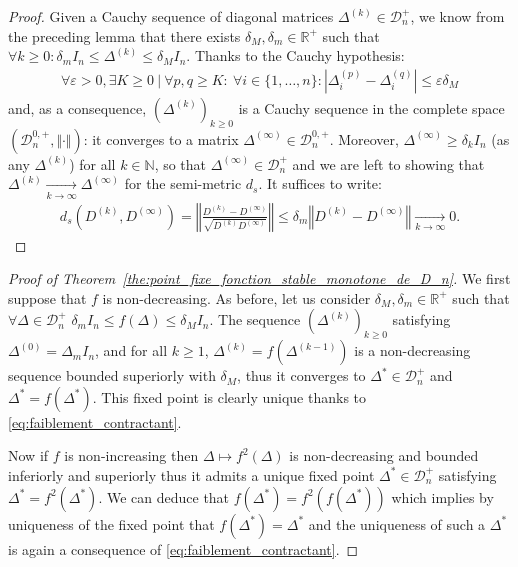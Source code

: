 \documentclass[a4papaer, titlepage]{book}
\begin{document}
\begin{proof}%
  Given a Cauchy sequence of diagonal matrices $\Delta^{(k)} \in \mathcal D_n^+$, we know from the preceding lemma that there exists $\delta_M,\delta_m\in \mathbb R^+ $ such that $\forall k\geq 0:\delta_m I_n \leq \Delta^{(k)} \leq \delta_M I_n$.
  Thanks to the Cauchy hypothesis:
  \begin{align*}
    \forall \varepsilon >0, \exists K \geq 0 \ | \ \forall p,q \geq K: \ \forall i \in \{1,\ldots,n\}: \left\vert \Delta_i^{(p)} - \Delta_i^{(q)}\right\vert \leq \varepsilon \delta_M
  \end{align*}
  and, as a consequence, $(\Delta^{(k)})_{k\geq 0}$ is a Cauchy sequence in the complete space $(\mathcal D_n^{0,+}, \Vert \cdot \Vert)$: it converges to a matrix $\Delta^{(\infty)} \in \mathcal D_n^{0,+}$. Moreover, $\Delta^{(\infty)}\geq \delta_k I_n$ (as any $\Delta^{(k)}$) for all $k\in \mathbb N$, so that $\Delta^{(\infty)} \in \mathcal D_n^+$ and we are left to showing that $\Delta^{(k)}\underset{k \to\infty}{\longrightarrow}\Delta^{(\infty)}$ for the semi-metric $d_s$. It suffices to write:
  \begin{align*}
    d_s(D^{(k)},D^{(\infty)}) = \left\Vert \frac{D^{(k)}-D^{(\infty)}}{\sqrt {D^{(k)}D^{(\infty)}}}\right\Vert \leq \delta_m\left\Vert D^{(k)}-D^{(\infty)}\right\Vert \underset{k \to\infty}{\longrightarrow} 0.
  \end{align*}
\end{proof}
\begin{proof}[Proof of Theorem~\ref{the:point_fixe_fonction_stable_monotone_de_D_n}]
  We first suppose that $f$ is non-decreasing. As before, let us consider $\delta_M,\delta_m \in \mathbb R^+$ such that $\forall \Delta \in \mathcal D_n^+$ $\delta_m I_n \leq f(\Delta) \leq \delta_M I_n$. The sequence $(\Delta^{(k)})_{k\geq 0}$ satisfying $\Delta^{(0)} = \Delta_m I_n$, and for all $k\geq 1$, $\Delta^{(k)} = f(\Delta^{(k-1)})$ is a non-decreasing sequence bounded superiorly with $\delta_M$, thus it converges to $\Delta^* \in \mathcal D_n^+$ and $\Delta^* = f(\Delta^*)$. This fixed point is clearly unique thanks to \eqref{eq:faiblement_contractant}. 

  Now if $f$ is non-increasing then $\Delta \mapsto f^2(\Delta)$ is non-decreasing and bounded inferiorly and superiorly thus it admits a unique fixed point $\Delta^* \in \mathcal D_n^+$ satisfying $\Delta^* = f^2(\Delta^*)$. We can deduce that $f(\Delta^*) = f^2(f(\Delta^*))$ which implies by uniqueness of the fixed point that $f(\Delta^*) = \Delta^*$ and the uniqueness of such a $\Delta^*$ is again a consequence of \eqref{eq:faiblement_contractant}.
\end{proof}
\end{document}
